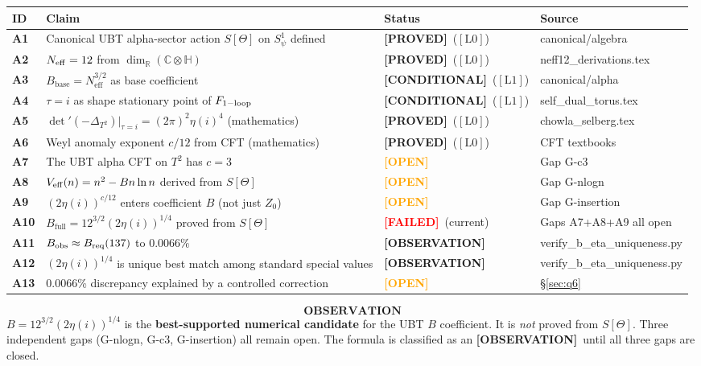 \documentclass[12pt,a4paper]{article}
\theoremstyle{definition}
\theoremstyle{remark}
\newcommand{\PROVED}{\textcolor{green!60!black}{\textbf{[PROVED]}}}
\newcommand{\CONDITIONAL}{\textcolor{blue!70!black}{\textbf{[CONDITIONAL]}}}
\newcommand{\OBSERVATION}{\textcolor{violet!80!black}{\textbf{[OBSERVATION]}}}
\newcommand{\OPEN}{\textcolor{orange}{\textbf{[OPEN]}}}
\newcommand{\FAILED}{\textcolor{red}{\textbf{[FAILED]}}}
\newcommand{\Lzero}{$[\mathrm{L0}]$}
\newcommand{\Lone}{$[\mathrm{L1}]$}
\newcommand{\Neff}{N_{\mathrm{eff}}}
\newcommand{\Bbase}{B_{\mathrm{base}}}
\newcommand{\Bfull}{B_{\mathrm{full}}}
\newcommand{\Breq}{B_{\mathrm{req}}}
\newcommand{\CC}{\mathbb{C}}
\newcommand{\HH}{\mathbb{H}}
\newcommand{\RR}{\mathbb{R}}
\begin{document}
\begin{longtable}{>{\bfseries}p{}
                  p{}
                  >{\centering\arraybackslash}p{}
                  p{}}
\toprule
\textbf{ID} & \textbf{Claim} & \textbf{Status} & \textbf{Source} \\
\midrule\endhead
A1 & Canonical UBT alpha-sector action $S[\Theta]$ on $S^1_\psi$ defined
   & \PROVED\ (\Lzero)
   & canonical/algebra \\[3pt]
A2 & $N_{\rm eff} = 12$ from $\dim_\RR(\CC\otimes\HH)$
   & \PROVED\ (\Lzero)
   & neff12\_derivations.tex \\[3pt]
A3 & $\Bbase = \Neff^{3/2}$ as base coefficient
   & \CONDITIONAL\ (\Lone)
   & canonical/alpha \\[3pt]
A4 & $\tau = i$ as shape stationary point of $F_{\rm 1-loop}$
   & \CONDITIONAL\ (\Lone)
   & self\_dual\_torus.tex \\[3pt]
A5 & $\det'(-\Delta_{T^2})|_{\tau=i} = (2\pi)^2\eta(i)^4$ (mathematics)
   & \PROVED\ (\Lzero)
   & chowla\_selberg.tex \\[3pt]
A6 & Weyl anomaly exponent $c/12$ from CFT (mathematics)
   & \PROVED\ (\Lzero)
   & CFT textbooks \\[3pt]
A7 & The UBT alpha CFT on $T^2$ has $c = 3$
   & \OPEN
   & Gap G-c3 \\[3pt]
A8 & $V_{\rm eff}(n) = n^2 - Bn\ln n$ derived from $S[\Theta]$
   & \OPEN
   & Gap G-nlogn \\[3pt]
A9 & $(2\eta(i))^{c/12}$ enters coefficient $B$ (not just $Z_0$)
   & \OPEN
   & Gap G-insertion \\[3pt]
A10 & $\Bfull = 12^{3/2}(2\eta(i))^{1/4}$ proved from $S[\Theta]$
   & \FAILED\ (current)
   & Gaps A7+A8+A9 all open \\[3pt]
A11 & $B_{\rm obs} \approx \Breq(137)$ to $0.0066\%$
   & \OBSERVATION
   & verify\_b\_eta\_uniqueness.py \\[3pt]
A12 & $(2\eta(i))^{1/4}$ is unique best match among standard special values
   & \OBSERVATION
   & verify\_b\_eta\_uniqueness.py \\[3pt]
A13 & 0.0066\% discrepancy explained by a controlled correction
   & \OPEN
   & §\ref{sec:q6} \\[3pt]
\bottomrule
\end{longtable}

\medskip
\begin{tcolorbox}[colback=yellow!6!white, colframe=orange!70!black,
                  title=\textbf{Master Verdict}]
\[
  \boxed{\textbf{OBSERVATION}}
\]
$B = 12^{3/2}(2\eta(i))^{1/4}$ is the \textbf{best-supported numerical
candidate} for the UBT $B$ coefficient.  It is \emph{not} proved from
$S[\Theta]$.  Three independent gaps (G-nlogn, G-c3, G-insertion) all
remain open.  The formula is classified as an \OBSERVATION\ until all
three gaps are closed.
\end{tcolorbox}
\end{document}
